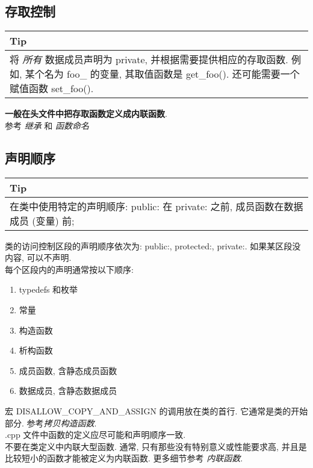 \documentclass[a4paper,11pt,CJK]{article}
\begin{document}
\begin{CJK}{UTF8}{gbsn}
\subsection{存取控制}
\begin{table}[htbp]
\flushleft
\begin{tabular}{p{400pt}}
\toprule
\rowcolor[gray]{.8} Tip \\
\midrule
将 \emph{所有} 数据成员声明为 private, 并根据需要提供相应的存取函数. 例如, 某个名为 foo\_ 的变量, 其取值函数是 get\_foo(). 还可能需要一个赋值函数 set\_foo().\\
\bottomrule
\end{tabular}
\end{table}
\textbf{一般在头文件中把存取函数定义成内联函数}.\\
\indent 参考 \emph{继承} 和 \emph{函数命名}

\subsection{声明顺序}
\begin{table}[htbp]
\flushleft
\begin{tabular}{p{400pt}}
\toprule
\rowcolor[gray]{.8} Tip \\
\midrule
在类中使用特定的声明顺序: public: 在 private: 之前, 成员函数在数据成员 (变量) 前;\\
\bottomrule
\end{tabular}
\end{table}
类的访问控制区段的声明顺序依次为: public:, protected:, private:. 如果某区段没内容, 可以不声明.\\
\indent 每个区段内的声明通常按以下顺序:
\begin{enumerate}
\item[\labelitemi]
typedefs 和枚举
\item[\labelitemi]
常量
\item[\labelitemi]
构造函数
\item[\labelitemi]
析构函数
\item[\labelitemi]
成员函数, 含静态成员函数
\item[\labelitemi]
数据成员, 含静态数据成员
\end{enumerate}
\indent 宏 DISALLOW\_COPY\_AND\_ASSIGN 的调用放在类的首行. 它通常是类的开始部分. 参考\emph{拷贝构造函数}.\\
\indent .cpp 文件中函数的定义应尽可能和声明顺序一致.\\
\indent 不要在类定义中内联大型函数. 通常, 只有那些没有特别意义或性能要求高, 并且是比较短小的函数才能被定义为内联函数. 更多细节参考 \emph{内联函数}.


\end{CJK}
\end{document}
